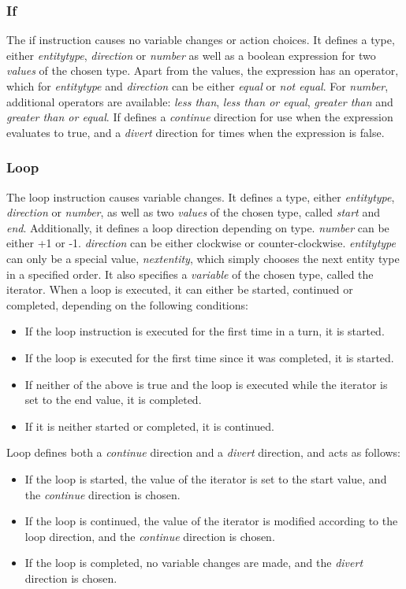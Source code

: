 \subsubsection{If}
The if instruction causes no variable changes or action choices. It defines a type, either \emph{entitytype}, \emph{direction} or \emph{number} as well as a boolean expression for two \emph{values} of the chosen type. Apart from the values, the expression has an operator, which for \emph{entitytype} and \emph{direction} can be either \emph{equal} or \emph{not equal}. For  \emph{number}, additional operators are available: \emph{less than}, \emph{less than or equal}, \emph{greater than} and \emph{greater than or equal}.
If defines a \emph{continue} direction for use when the expression evaluates to true, and a \emph{divert} direction for times when the expression is false.

\subsubsection{Loop}
The loop instruction causes variable changes. It defines a type, either \emph{entitytype}, \emph{direction} or \emph{number}, as well as two \emph{values} of the chosen type, called \emph{start} and \emph{end}. Additionally, it defines a loop direction depending on type. \emph{number} can be either +1 or -1. \emph{direction} can be either clockwise or counter-clockwise. \emph{entitytype} can only be a special value, \emph{nextentity}, which simply chooses the next entity type in a specified order. It also specifies a \emph{variable} of the chosen type, called the iterator. When a loop is executed, it can either be started, continued or completed, depending on the following conditions:
\begin{itemize}
\item If the loop instruction is executed for the first time in a turn, it is started.
\item If the loop is executed for the first time since it was completed, it is started.
\item If neither of the above is true and the loop is executed while the iterator is set to the end value, it is completed.
\item If it is neither started or completed, it is continued.
\end{itemize}
Loop defines both a \emph{continue} direction and a \emph{divert} direction, and acts as follows:
\begin{itemize}
\item If the loop is started, the value of the iterator is set to the start value, and the \emph{continue} direction is chosen.
\item If the loop is continued, the value of the iterator is modified according to the loop direction, and the \emph{continue} direction is chosen.
\item If the loop is completed, no variable changes are made, and the \emph{divert} direction is chosen.
\end{itemize}
